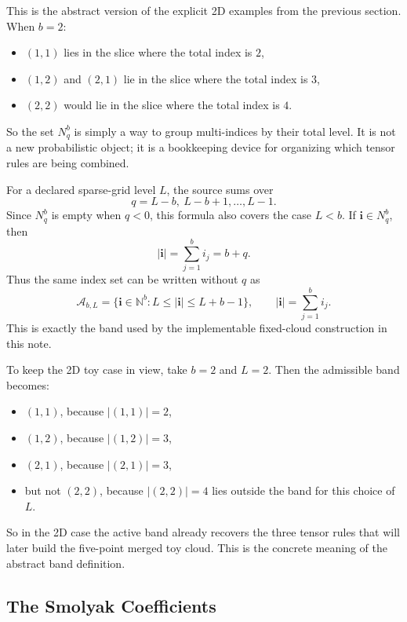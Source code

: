 \documentclass[11pt]{article}
\numberwithin{equation}{section}
\begin{document}
This is the abstract version of the explicit 2D examples from the previous
section.  When \(b=2\):
\begin{itemize}[leftmargin=0.28in]
  \item \((1,1)\) lies in the slice where the total index is \(2\),
  \item \((1,2)\) and \((2,1)\) lie in the slice where the total index is
  \(3\),
  \item \((2,2)\) would lie in the slice where the total index is \(4\).
\end{itemize}
So the set \(N_q^b\) is simply a way to group multi-indices by their total
level.  It is not a new probabilistic object; it is a bookkeeping device for
organizing which tensor rules are being combined.

For a declared sparse-grid level \(L\), the source sums over
\[
  q=L-b,\ L-b+1,\ldots,L-1.
\]
Since \(N_q^b\) is empty when \(q<0\), this formula also covers the case
\(L<b\).  If \(\mathbf i\in N_q^b\), then
\begin{equation}
  |\mathbf i|=\sum_{j=1}^b i_j=b+q.
  \label{eq:p32-index-sum-q}
\end{equation}
Thus the same index set can be written without \(q\) as
\begin{equation}
  \mathcal A_{b,L}
  =
  \{\mathbf i\in\mathbb N^b: L\le |\mathbf i|\le L+b-1\},
  \qquad |\mathbf i|=\sum_{j=1}^b i_j.
  \label{eq:p31-level-band}
\end{equation}
This is exactly the band used by the implementable fixed-cloud construction in
this note.

To keep the 2D toy case in view, take \(b=2\) and \(L=2\).  Then the admissible
band becomes:
\begin{itemize}[leftmargin=0.28in]
  \item \((1,1)\), because \(|(1,1)|=2\),
  \item \((1,2)\), because \(|(1,2)|=3\),
  \item \((2,1)\), because \(|(2,1)|=3\),
  \item but not \((2,2)\), because \(|(2,2)|=4\) lies outside the band for this
  choice of \(L\).
\end{itemize}
So in the 2D case the active band already recovers the three tensor rules that
will later build the five-point merged toy cloud.  This is the concrete meaning
of the abstract band definition.

\subsection{The Smolyak Coefficients}
\label{subsec:p32-smolyak-coefficients}
\end{document}
